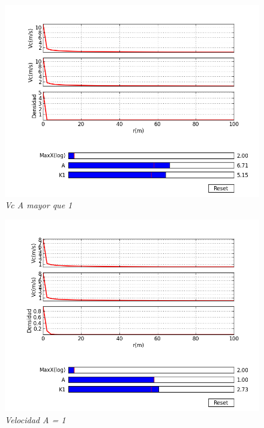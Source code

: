 \documentclass[12pt]{book}
\begin{document}
\begin{figure}[!h]
 \centering
 \includegraphics[scale=0.7]{velocity4.png}
 \caption{\emph{Vc A mayor que 1}}
 \label{Fig: 1}
\end{figure}

\begin{figure}[!h]
 \centering
 \includegraphics[scale=0.7]{velocity.png}
 \caption{\emph{Velocidad A = 1}}
 \label{Fig: 1}
\end{figure}
\end{document}
